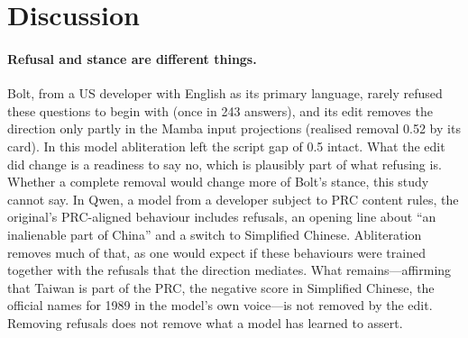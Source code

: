 \documentclass[11pt,a4paper]{article}
\begin{document}
\section{Discussion}\label{sec:discussion}

\paragraph{Refusal and stance are different things.}
Bolt, from a US developer with English as its primary language, rarely refused these questions to begin with (once
in 243 answers), and its edit removes the direction only partly in the Mamba input projections (realised removal 0.52
by its card). In this model abliteration left the script gap of 0.5 intact. What the edit did change is a readiness to say
no, which is plausibly part of what refusing is. Whether a complete removal would change more of Bolt's stance, this
study cannot say. In Qwen, a model from a developer subject to PRC
content rules, the original's PRC-aligned behaviour includes refusals, an opening line about ``an inalienable part of
China'' and a switch to Simplified Chinese. Abliteration removes much of that, as one would expect if these behaviours
were trained together with the refusals that the direction mediates. What remains---affirming that Taiwan is part of
the PRC, the negative score in Simplified Chinese, the official names for 1989 in the model's own voice---is not
removed by the edit. Removing refusals does not remove what a model has learned to assert.
\end{document}
